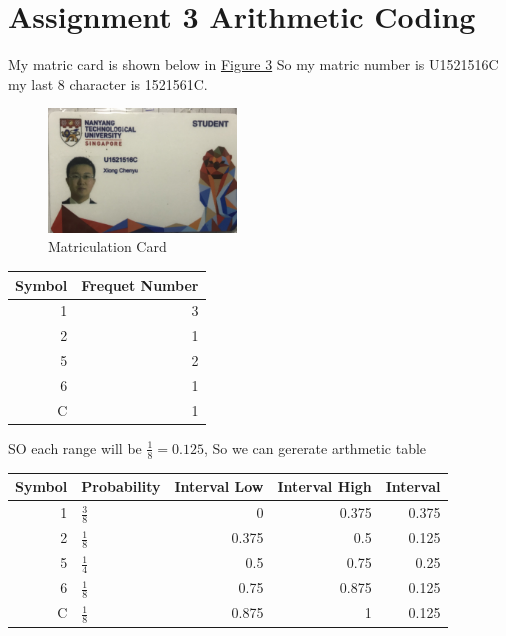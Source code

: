\documentclass[titlepage]{article}
\begin{document}
\newpage

\section{Assignment 3 Arithmetic Coding}
\label{sec:org3c0589c}

My matric card is shown below in \hyperref[fig:3]{Figure 3} So my matric number is U1521516C my last 8 character is 1521561C.

\begin{figure}[htbp]
\centering
\includegraphics[width=5cm]{./img/mat.jpg}
\caption{\label{fig:3}Matriculation Card}
\end{figure}

\begin{center}
\begin{tabular}{rr}
Symbol & Frequet Number\\
\hline
1 & 3\\
2 & 1\\
5 & 2\\
6 & 1\\
C & 1\\
\end{tabular}
\end{center}

SO each range will be \(\frac{1}{8} = 0.125\), So we can gererate arthmetic table

\begin{center}
\begin{tabular}{rlrrr}
Symbol & Probability & Interval  Low & Interval   High & Interval\\
\hline
1 & \(\frac{3}{8}\) & 0 & 0.375 & 0.375\\
2 & \(\frac{1}{8}\) & 0.375 & 0.5 & 0.125\\
5 & \(\frac{1}{4}\) & 0.5 & 0.75 & 0.25\\
6 & \(\frac{1}{8}\) & 0.75 & 0.875 & 0.125\\
C & \(\frac{1}{8}\) & 0.875 & 1 & 0.125\\
\end{tabular}
\end{center}
\end{document}
